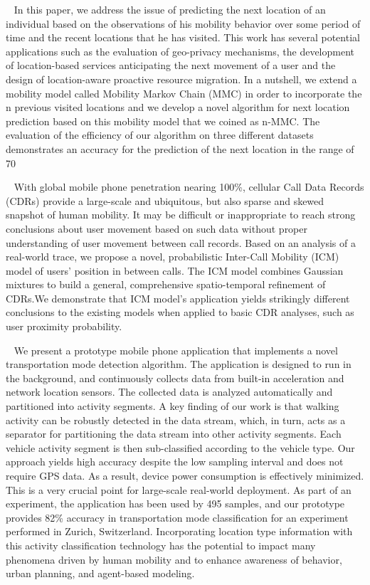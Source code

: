 ~\cite{gambs2012next}
In this paper, we address the issue of predicting the next location of an individual based on the observations of his mobility behavior over some period of time and the recent locations that he has visited. This work has several potential applications such as the evaluation of geo-privacy mechanisms, the development of location-based services anticipating the next movement of a user and the design of location-aware proactive resource migration. In a nutshell, we extend a mobility model called Mobility Markov Chain (MMC) in order to incorporate the n previous visited locations and we develop a novel algorithm for next location prediction based on this mobility model that we coined as n-MMC. The evaluation of the efficiency of our algorithm on three different datasets demonstrates an accuracy for the prediction of the next location in the range of 70%

~\cite{ficek2012inter}
With global mobile phone penetration nearing 100\%, cellular Call Data Records (CDRs) provide a large-scale and ubiquitous, but also sparse and skewed snapshot of human mobility. It may be difficult or inappropriate to reach strong conclusions about user movement based on such data without proper understanding of user movement between call records. Based on an analysis of a real-world trace, we propose a novel, probabilistic Inter-Call Mobility (ICM) model of users' position in between calls. The ICM model combines Gaussian mixtures to build a general, comprehensive spatio-temporal refinement of CDRs.We demonstrate that ICM model's application yields strikingly different conclusions to the existing models when applied to basic CDR analyses, such as user proximity probability.

~\cite{shin2015urban}
We present a prototype mobile phone application that implements a novel transportation mode detection algorithm. The application is designed to run in the background, and continuously collects data from built-in acceleration and network location sensors. The collected data is analyzed automatically and partitioned into activity segments. A key finding of our work is that walking activity can be robustly detected in the data stream, which, in turn, acts as a separator for partitioning the data stream into other activity segments. Each vehicle activity segment is then sub-classified according to the vehicle type. Our approach yields high accuracy despite the low sampling interval and does not require GPS data. As a result, device power consumption is effectively minimized. This is a very crucial point for large-scale real-world deployment. As part of an experiment, the application has been used by 495 samples, and our prototype provides 82\% accuracy in transportation mode classification for an experiment performed in Zurich, Switzerland. Incorporating location type information with this activity classification technology has the potential to impact many phenomena driven by human mobility and to enhance awareness of behavior, urban planning, and agent-based modeling.

